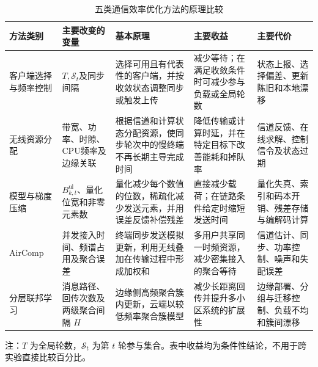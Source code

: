 \begin{table}[t]
  \centering
  \caption{五类通信效率优化方法的原理比较}
  \label{tab:method-comparison}
  \begin{threeparttable}
    \small
    \setlength{\tabcolsep}{4pt}
    \renewcommand{\arraystretch}{1.28}
    \begin{tabularx}{\textwidth}{
      @{}>{\centering\arraybackslash}p{1.85cm}
      >{\centering\arraybackslash}p{2.25cm}
      >{\raggedright\arraybackslash}X
      >{\raggedright\arraybackslash}X
      >{\raggedright\arraybackslash}X@{}}
      \toprule
      方法类别 & 主要改变的变量 & 基本原理 & 主要收益 & 主要代价 \\
      \midrule
      客户端选择与频率控制
        & \(T,\mathcal S_t\)及同步间隔
        & 选择可用且有代表性的客户端，并按收敛状态调整同步或触发上传
        & 减少等待；在满足收敛条件时可减少参与负载或全局轮数
        & 状态上报、选择偏差、更新陈旧和本地漂移\cite{Nishio2019FedCS,Wang2019AdaptiveFL,Zhang2024ClientSelectionSurvey} \\
      无线资源分配
        & 带宽、功率、时隙、CPU频率及边缘关联
        & 根据信道和计算状态分配资源，使同步轮次中的慢终端不再长期主导完成时间
        & 降低传输或计算时延，并在特定目标下改善能耗和掉队率
        & 信道反馈、在线求解、控制信令及状态过期\cite{Dinh2021WirelessConvergence,Xu2022MultiFLBandwidth,Fan2025EdgeAssociation} \\
      模型与梯度压缩
        & \(B_{k,t}^{\mathrm{ul}}\)、量化位宽和非零元素数
        & 量化减少每个数值的位数，稀疏化减少发送元素，并用误差反馈补偿残差
        & 直接减少载荷；在链路条件给定时缩短发送时间
        & 量化失真、索引和码本开销、残差存储与编解码计算\cite{Reisizadeh2020FedPAQ,Sattler2020STC,Marnissi2024AdaptiveSQ} \\
      AirComp
        & 并发接入时间、频谱占用及聚合误差
        & 终端同步发送模拟更新，利用无线叠加在传输过程中形成加权和
        & 多用户共享同一时频资源，减少密集接入的聚合等待
        & 信道估计、同步、功率控制、噪声和失配误差\cite{Zhu2020BroadbandAnalog,Tegin2023TimeVaryingOTA,Oh2024SparseOneBitOTA} \\
      分层联邦学习
        & 消息路径、回传次数及两级聚合间隔 \(H\)
        & 边缘侧高频聚合簇内更新，云端以较低频率聚合簇模型
        & 减少长距离回传并提升多小区系统的扩展性
        & 边缘部署、分组与迁移控制、负载不均和簇间漂移\cite{Liu2020HierarchicalFL,Liu2023HierarchicalQuantization,Wang2023HierarchicalIoT} \\
      \bottomrule
    \end{tabularx}
    \begin{tablenotes}[flushleft]
      \footnotesize
      \item 注：\(T\) 为全局轮数，\(\mathcal S_t\) 为第 \(t\) 轮参与集合。表中收益均为条件性结论，不用于跨实验直接比较百分比。
    \end{tablenotes}
  \end{threeparttable}
\end{table}
